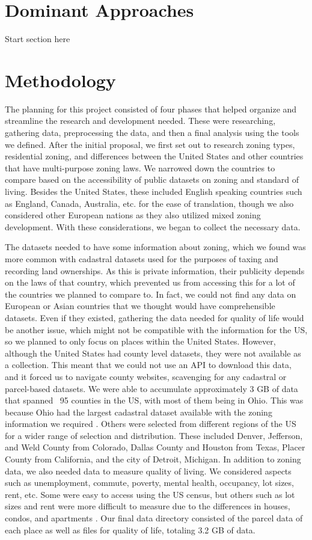 \documentclass[titlepage]{article}
\begin{document}
\section{Dominant Approaches}
Start section here

\section{Methodology}
The planning for this project consisted of four phases that helped organize and streamline the research and development needed. These were researching, gathering data, preprocessing the data, and then a final analysis using the tools we defined. After the initial proposal, we first set out to research zoning types, residential zoning, and differences between the United States and other countries that have multi-purpose zoning laws. We narrowed down the countries to compare based on the accessibility of public datasets on zoning and standard of living. Besides the United States, these included English speaking countries such as England, Canada, Australia, etc. for the ease of translation, though we also considered other European nations as they also utilized mixed zoning development. With these considerations, we began to collect the necessary data.

The datasets needed to have some information about zoning, which we found was more common with cadastral datasets used for the purposes of taxing and recording land ownerships. As this is private information, their publicity depends on the laws of that country, which prevented us from accessing this for a lot of the countries we planned to compare to. In fact, we could not find any data on European or Asian countries that we thought would have comprehensible datasets. Even if they existed, gathering the data needed for quality of life would be another issue, which might not be compatible with the information for the US, so we planned to only focus on places within the United States. However, although the United States had county level datasets, they were not available as a collection. This meant that we could not use an API to download this data, and it forced us to navigate county websites, scavenging for any cadastral or parcel-based datasets. We were able to accumulate approximately 3 GB of data that spanned ~95 counties in the US, with most of them being in Ohio. This was because Ohio had the largest cadastral dataset available with the zoning information we required \cite{koordinates}. Others were selected from different regions of the US for a wider range of selection and distribution. These included Denver, Jefferson, and Weld County from Colorado, Dallas County and Houston from Texas, Placer County from California, and the city of Detroit, Michigan. In addition to zoning data, we also needed data to measure quality of living. We considered aspects such as unemployment, commute, poverty, mental health, occupancy, lot sizes, rent, etc. Some were easy to access using the US census, but others such as lot sizes and rent were more difficult to measure due to the differences in houses, condos, and apartments \cite{uscensus}. Our final data directory consisted of the parcel data of each place as well as files for quality of life, totaling 3.2 GB of data.
\end{document}
